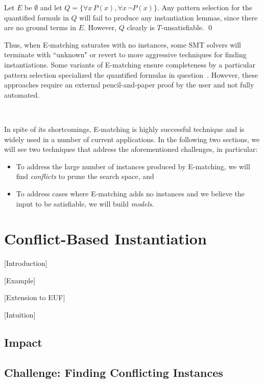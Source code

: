 \documentclass[oribibl]{llncs}
\begin{document}
\begin{example}
Let $E$ be $\emptyset$ and let $Q = \{ \forall x\, P( x ), \forall x\, \neg P( x ) \}$.
Any pattern selection for the quantified formuls in $Q$ will fail to produce any instantiation lemmas,
since there are no ground terms in $E$.
However, $Q$ clearly is $T$-unsatisfiable.
\qed
\end{example}

Thus, when E-matching saturates with no instances, some SMT solvers will terminate with ``unknown"
or revert to more aggressive techniques for finding instantiations.
Some variants of E-matching ensure completeness by a particular pattern selection specialized the quantified formulas in question~\cite{}.
However, these approaches require an external pencil-and-paper proof by the user and not fully automated.

\ 

In spite of its shortcomings, E-matching is highly successful technique 
and is widely used in a number of current applications.
In the following two sections, we will see two techniques that address the aforementioned challenges, in particular:
\begin{itemize}
\item To address the large number of instances produced by E-matching, we will find \emph{conflicts} to prune the search space, and
\item To address cases where E-matching adds no instances and we believe the input to be satisfiable, we will build \emph{models}.
\end{itemize}


\section{Conflict-Based Instantiation}
\label{sec:cbqi}

[Introduction]

[Example]

[Extension to EUF]

[Intuition]

\subsection{Impact}

\subsection{Challenge: Finding Conflicting Instances}
\end{document}
